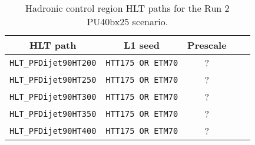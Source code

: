 \begin{table}[h!]
\footnotesize
\centering
\begin{tabular}{|c||c|c|c||c|} 
\hline
HLT path & L1 seed & Prescale \\[0.7 ex] 
\hline
\verb!HLT_PFDijet90HT200! & \verb!HTT175 OR ETM70! & ? \\
\verb!HLT_PFDijet90HT250! & \verb!HTT175 OR ETM70! & ? \\
\verb!HLT_PFDijet90HT300! & \verb!HTT175 OR ETM70! & ? \\
\verb!HLT_PFDijet90HT350! & \verb!HTT175 OR ETM70! & ? \\
\verb!HLT_PFDijet90HT400! & \verb!HTT175 OR ETM70! & ? \\
\hline


\end{tabular}
\caption{Hadronic control region HLT paths for the Run 2 PU40bx25 scenario. }
\label{tab:2015_Hadronic_Control_Triggers}
\end{table}











